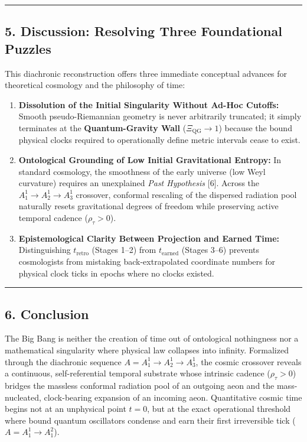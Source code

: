 \documentclass[
]{article}
\providecommand{\tightlist}{%
  \setlength{\itemsep}{0pt}\setlength{\parskip}{0pt}}
\begin{document}
\begin{center}\rule{0.5\linewidth}{0.5pt}\end{center}

\subsection{5. Discussion: Resolving Three Foundational
Puzzles}\label{discussion-resolving-three-foundational-puzzles}

This diachronic reconstruction offers three immediate conceptual
advances for theoretical cosmology and the philosophy of time:

\begin{enumerate}
\def\labelenumi{\arabic{enumi}.}
\tightlist
\item
  \textbf{Dissolution of the Initial Singularity Without Ad-Hoc
  Cutoffs:} Smooth pseudo-Riemannian geometry is never arbitrarily
  truncated; it simply terminates at the \textbf{Quantum-Gravity Wall}
  (\(\Xi_{\mathrm{QG}} \to 1\)) because the bound physical clocks
  required to operationally define metric intervals cease to exist.
\item
  \textbf{Ontological Grounding of Low Initial Gravitational Entropy:}
  In standard cosmology, the smoothness of the early universe (low Weyl
  curvature) requires an unexplained \emph{Past Hypothesis} {[}6{]}.
  Across the \(A_1^1 \to A_2^1 \to A_3^1\) crossover, conformal
  rescaling of the dispersed radiation pool naturally resets
  gravitational degrees of freedom while preserving active temporal
  cadence (\(\rho_\tau > 0\)).
\item
  \textbf{Epistemological Clarity Between Projection and Earned Time:}
  Distinguishing \(t_{\mathrm{retro}}\) (Stages 1--2) from
  \(t_{\mathrm{earned}}\) (Stages 3--6) prevents cosmologists from
  mistaking back-extrapolated coordinate numbers for physical clock
  ticks in epochs where no clocks existed.
\end{enumerate}

\begin{center}\rule{0.5\linewidth}{0.5pt}\end{center}

\subsection{6. Conclusion}\label{conclusion}

The Big Bang is neither the creation of time out of ontological
nothingness nor a mathematical singularity where physical law collapses
into infinity. Formalized through the diachronic sequence
\(A = A_1^1 \to A_2^1 \to A_3^1\), the cosmic crossover reveals a
continuous, self-referential temporal substrate whose intrinsic cadence
(\(\rho_\tau > 0\)) bridges the massless conformal radiation pool of an
outgoing aeon and the mass-nucleated, clock-bearing expansion of an
incoming aeon. Quantitative cosmic time begins not at an unphysical
point \(t = 0\), but at the exact operational threshold where bound
quantum oscillators condense and earn their first irreversible tick
(\(A = A_1^1 \to A_1^2\)).
\end{document}
